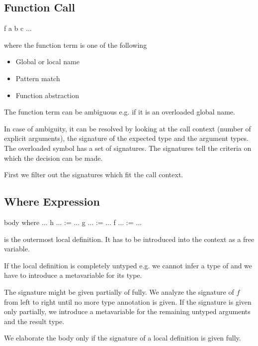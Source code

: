 \vskip 5mm
\subsection{Function Call}


\begin{alba}
    f a b c ...
\end{alba}
where the function term  is one of the following

\begin{itemize}
\item
    Global or local name
\item
    Pattern match
\item
    Function abstraction
\end{itemize}

The function term can be ambiguous e.g. if it is an overloaded global name.

In case of ambiguity, it can be resolved by looking at the call context (number
of explicit arguments), the signature of the expected type and the argument
types. The overloaded symbol has a set of signatures. The signatures tell the
criteria on which the decision can be made.

First we filter out the signatures which fit the call context.



\subsection{Where Expression}

\begin{alba}
    body where
        ...
        h ... := ...
        g ... := ...
        f ... := ...
\end{alba}

 is the outermost local definition. It has to be introduced into the
context as a free variable.

If the local definition is completely untyped e.g.
 we cannot infer a type of  and we have to
introduce a metavariable for its type.

The signature might be given partially of fully. We analyze the signature of $f$
from left to right until no more type annotation is given. If the signature is
given only partially, we introduce a metavariable for the remaining untyped
arguments and the result type.

We elaborate the body only if the signature of a local definition is given
fully.

